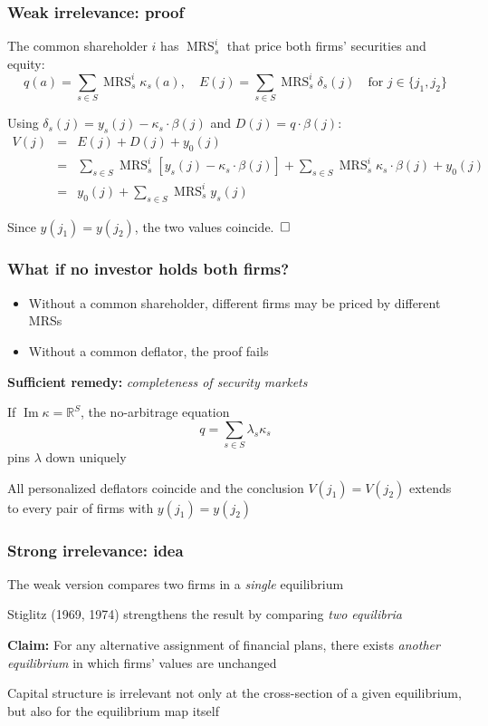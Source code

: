 \documentclass[blue]{beamer}
\def\R{\mathbb{R}}
\def\boite{\hskip 0.5mm {\Box} \hskip 0.5mm}
\DeclareMathOperator\MRS{MRS}
\DeclareMathOperator\Range{Im}
\theoremstyle{definition}
\theoremstyle{example}
\begin{document}
\begin{frame}\frametitle{Weak irrelevance: proof}
\begin{small}
The common shareholder $i$ has $\MRS^i_s$ that price both firms' securities and equity:
\begin{equation*}
q(a) = \sum_{s \in S} \MRS^i_s \kappa_s(a), \quad
E(j) = \sum_{s \in S} \MRS^i_s \delta_s(j) \quad \text{for $j \in \{j_1, j_2\}$}
\end{equation*}
\bigskip

Using $\delta_s(j) = y_s(j) - \kappa_s \cdot \beta(j)$ and $D(j) = q \cdot \beta(j)$:
\begin{eqnarray*}
V(j) & = & E(j) + D(j) + y_0(j) \\
& = & \sum_{s \in S} \MRS^i_s [y_s(j) - \kappa_s \cdot \beta(j)] + \sum_{s \in S} \MRS^i_s \kappa_s \cdot \beta(j) + y_0(j) \\
& = & y_0(j) + \sum_{s \in S} \MRS^i_s y_s(j)
\end{eqnarray*}
\bigskip

Since $y(j_1) = y(j_2)$, the two values coincide. $\boite$
\end{small}
\end{frame}

\begin{frame}\frametitle{What if no investor holds both firms?}
\begin{itemize}
\item Without a common shareholder, different firms may be priced by different MRSs
\item Without a common deflator, the proof fails
\end{itemize}
\bigskip

\textbf{Sufficient remedy:} \emph{completeness of security markets}
\bigskip

If $\Range \kappa = \R^S$, the no-arbitrage equation
\begin{equation*}
q = \sum_{s \in S} \lambda_s \kappa_s
\end{equation*}
pins $\lambda$ down uniquely
\bigskip

All personalized deflators coincide and the conclusion $V(j_1) = V(j_2)$ extends to every pair of firms with $y(j_1) = y(j_2)$
\end{frame}

\begin{frame}\frametitle{Strong irrelevance: idea}
The weak version compares two firms in a \emph{single} equilibrium
\bigskip

Stiglitz (1969, 1974) strengthens the result by comparing \emph{two equilibria}
\bigskip

\textbf{Claim:} For any alternative assignment of financial plans, there exists \emph{another equilibrium} in which firms' values are unchanged
\bigskip

Capital structure is irrelevant not only at the cross-section of a given equilibrium, but also for the equilibrium map itself
\end{frame}
\end{document}
